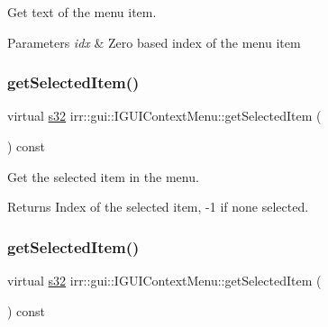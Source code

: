 Get text of the menu item. 


\begin{DoxyParams}{Parameters}
{\em idx} & Zero based index of the menu item \\
\hline
\end{DoxyParams}
\mbox{\label{classirr_1_1gui_1_1IGUIContextMenu_ae6cd391cf56d4454a855e19feddf8fdc}} 
\subsubsection{\texorpdfstring{get\+Selected\+Item()}{getSelectedItem()}\hspace{0.1cm}{\footnotesize\ttfamily [1/2]}}
{\footnotesize\ttfamily virtual \hyperlink{namespaceirr_ac66849b7a6ed16e30ebede579f9b47c6}{s32} irr\+::gui\+::\+I\+G\+U\+I\+Context\+Menu\+::get\+Selected\+Item (\begin{DoxyParamCaption}{ }\end{DoxyParamCaption}) const\hspace{0.3cm}{\ttfamily [pure virtual]}}



Get the selected item in the menu. 

\begin{DoxyReturn}{Returns}
Index of the selected item, -\/1 if none selected. 
\end{DoxyReturn}
\mbox{\label{classirr_1_1gui_1_1IGUIContextMenu_ae6cd391cf56d4454a855e19feddf8fdc}} 
\subsubsection{\texorpdfstring{get\+Selected\+Item()}{getSelectedItem()}\hspace{0.1cm}{\footnotesize\ttfamily [2/2]}}
{\footnotesize\ttfamily virtual \hyperlink{namespaceirr_ac66849b7a6ed16e30ebede579f9b47c6}{s32} irr\+::gui\+::\+I\+G\+U\+I\+Context\+Menu\+::get\+Selected\+Item (\begin{DoxyParamCaption}{ }\end{DoxyParamCaption}) const\hspace{0.3cm}{\ttfamily [pure virtual]}}



